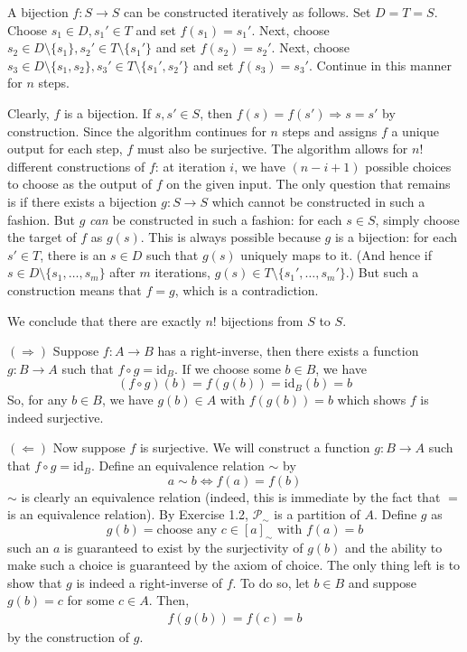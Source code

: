 \documentclass[a4paper]{report}
\newenvironment{ex}[1]
    {\noindent{\large \bf Exercise #1.}}{\vspace{0.5cm}}
\begin{document}
\begin{ex}{2.1}
  A bijection $f : S \rightarrow S$ can be constructed iteratively as
  follows. Set $D = T = S$.  Choose $s_1 \in D, s_1' \in T$ and set
  $f(s_1) = s_1'$. Next, choose $s_2 \in D \setminus \{s_1\}, s_2' \in
  T \setminus \{s_1'\}$ and set $f(s_2) = s_2'$.  Next, choose $s_3
  \in D \setminus \{s_1, s_2\}, s_3' \in T \setminus \{s_1',s_2'\}$
  and set $f(s_3) = s_3'$.  Continue in this manner for $n$ steps.

  Clearly, $f$ is a bijection. If $s, s' \in S$, then $f(s) = f(s')
  \Rightarrow s = s'$ by construction.  Since the algorithm continues
  for $n$ steps and assigns $f$ a unique output for each step, $f$
  must also be surjective.  The algorithm allows for $n!$ different
  constructions of $f$: at iteration $i$, we have $(n-i + 1)$ possible
  choices to choose as the output of $f$ on the given input. The only
  question that remains is if there exists a bijection $g : S
  \rightarrow S$ which cannot be constructed in such a fashion.  But
  $g$ \emph{can} be constructed in such a fashion: for each $s \in S$,
  simply choose the target of $f$ as $g(s)$. This is always possible
  because $g$ is a bijection: for each $s' \in T$, there is an $s \in
  D$ such that $g(s)$ uniquely maps to it. (And hence if $s \in D
  \setminus \{s_1, \dots, s_m\}$ after $m$ iterations, $g(s) \in T
  \setminus \{s_1', \dots, s_m'\}$.) But such a construction means
  that $f = g$, which is a contradiction.

  We conclude that there are exactly $n!$ bijections from $S$ to $S$.
\end{ex}

\begin{ex}{2.2}

  $(\Longrightarrow)$ Suppose $f : A \rightarrow B$ has a right-inverse, then there exists a function $g : B \rightarrow A$  such that
  $f \circ g = \text{id}_B$. If we choose some $b \in B$, we have
  \[
    (f \circ g)(b) = f(g(b))  = \text{id}_B (b) = b
  \]
  So, for any $b \in B$, we have $g(b) \in A$ with $f(g(b)) = b$ which shows $f$ is indeed surjective.

  $(\Longleftarrow)$ Now suppose $f$ is surjective. We will construct a function $g : B \rightarrow A$ such that $f \circ g = \text{id}_B$.
  Define an equivalence relation $\sim$ by
  \[
    a \sim b \Longleftrightarrow f(a) = f(b)
    \]
    $\sim$ is clearly an equivalence relation (indeed, this is immediate by the fact that $=$ is an equivalence relation). By Exercise 1.2,
    $\mathcal{P}_\sim$ is a partition of $A$. Define $g$ as
    \[ g(b) = \text{choose any $c \in [a]_\sim$ with $f(a) = b$}
    \]
    such an $a$ is guaranteed to exist by the surjectivity of $g(b)$ and the ability to make such a choice is guaranteed by the axiom of choice.
    The only thing left is to show that $g$ is indeed a right-inverse of $f$. To do so, let $b \in B$ and suppose $g(b) = c$ for some $c \in A$. Then,
    \begin{align*}
      f(g(b)) = f(c) = b
    \end{align*}
    by the construction of $g$.
\end{ex}
\end{document}
